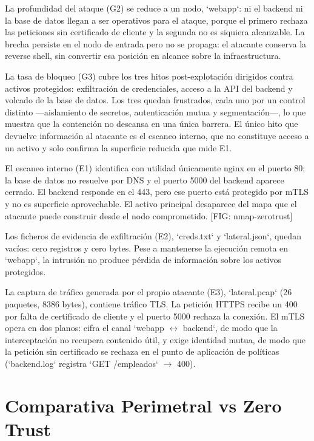 \documentclass[11pt,spanish,listoffigures,listoftables]{tfgetsinf}
\begin{document}
        La profundidad del ataque (G2) se reduce a un nodo, `webapp`: ni el backend ni la base de datos llegan a ser operativos para el ataque, porque el primero rechaza las peticiones sin certificado de cliente y la segunda no es siquiera alcanzable. La brecha persiste en el nodo de entrada pero no se propaga: el atacante conserva la reverse shell, sin convertir esa posición en alcance sobre la infraestructura.
        
        La tasa de bloqueo (G3) cubre los tres hitos post-explotación dirigidos contra activos protegidos: exfiltración de credenciales, acceso a la API del backend y volcado de la base de datos. Los tres quedan frustrados, cada uno por un control distinto —aislamiento de secretos, autenticación mutua y segmentación—, lo que muestra que la contención no descansa en una única barrera. El único hito que devuelve información al atacante es el escaneo interno, que no constituye acceso a un activo y solo confirma la superficie reducida que mide E1.
        
        El escaneo interno (E1) identifica con utilidad únicamente nginx en el puerto 80; la base de datos no resuelve por DNS y el puerto 5000 del backend aparece cerrado. El backend responde en el 443, pero ese puerto está protegido por mTLS y no es superficie aprovechable. El activo principal desaparece del mapa que el atacante puede construir desde el nodo comprometido. [FIG: nmap-zerotrust]
        
        Los ficheros de evidencia de exfiltración (E2), `creds.txt` y `lateral.json`, quedan vacíos: cero registros y cero bytes. Pese a mantenerse la ejecución remota en `webapp`, la intrusión no produce pérdida de información sobre los activos protegidos.
        
        La captura de tráfico generada por el propio atacante (E3), `lateral.pcap` (26 paquetes, 8386 bytes), contiene tráfico TLS. La petición HTTPS recibe un 400 por falta de certificado de cliente y el puerto 5000 rechaza la conexión. El mTLS opera en dos planos: cifra el canal `webapp $\leftrightarrow$ backend`, de modo que la interceptación no recupera contenido útil, y exige identidad mutua, de modo que la petición sin certificado se rechaza en el punto de aplicación de políticas (`backend.log` registra `GET /empleados` $\rightarrow$ 400).

    \section{Comparativa Perimetral vs Zero Trust}
    \label{sec:6.4}
\end{document}

